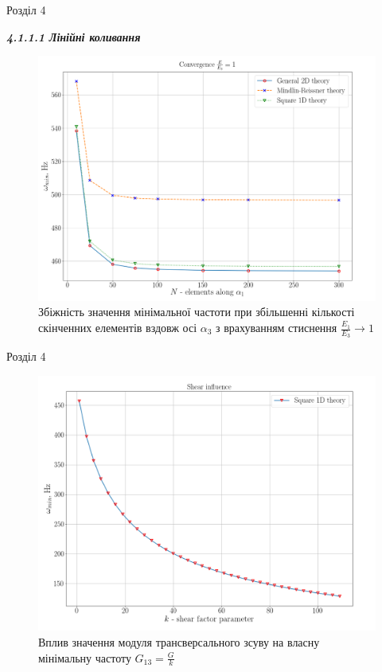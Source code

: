 \documentclass[8pt]{beamer}
\numberwithin{figure}{section}
\numberwithin{equation}{section}
\numberwithin{table}{section}
\begin{document}
\begin{frame}{Розділ 4}

\textbf{\textit{4.1.1.1 Лінійні коливання}}

\begin{figure}
	\includegraphics[scale=0.23]{pic/conv_all.png}
		\caption{Збіжність значення мінімальної частоти при збільшенні кількості скінченних елементів вздовж осі $\alpha_3$ з врахуванням стиснення $\frac{E_1}{E_3}\rightarrow1$}
		\label{fig:EE31}
\end{figure}

\end{frame}

\begin{frame}{Розділ 4}
\begin{figure}
	\includegraphics[scale=0.23]{pic/shear_inf.png}
		\caption{Вплив значення модуля трансверсального зсуву на власну мінімальну частоту $G_{13}=\frac{G}{k}$}
		\label{fig:shear}
\end{figure}

\end{frame}
\end{document}
